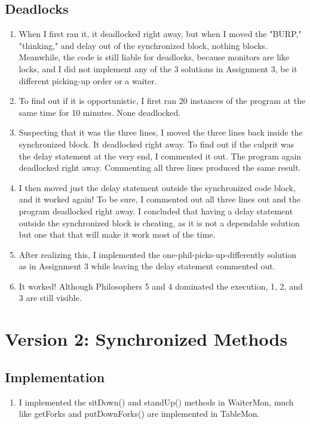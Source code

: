 \documentclass{article}
\begin{document}
\subsection{Deadlocks}
\begin{enumerate}
	\item [] When I first ran it, it deadlocked right away, but when I moved the "BURP," "thinking," and delay out of the synchronized block, nothing blocks. Meanwhile, the code is still liable for deadlocks, because monitors are like locks, and I did not implement any of the 3 solutions in Assignment 3, be it different picking-up order or a waiter.
	\item [] To find out if it is opportunistic, I first ran 20 instances of the program at the same time for 10 minutes. None deadlocked.
	\item [] Suspecting that it was the three lines, I moved the three lines back inside the synchronized block. It deadlocked right away. To find out if the culprit was the delay statement at the very end, I commented it out. The program again deadlocked right away. Commenting all three lines produced the same result.
	\item [] I then moved just the delay statement outside the synchronized code block, and it worked again! To be sure, I commented out all three lines out and the program deadlocked right away. I concluded that having a delay statement outside the synchronized block is cheating, as it is not a dependable solution but one that that will make it work most of the time.
	\item [] After realizing this, I implemented the one-phil-picks-up-differently solution as in Assignment 3 while leaving the delay statement commented out. 
	\item [] It worked! Although Philosophers 5 and 4 dominated the execution, 1, 2, and 3 are still visible.
\end{enumerate}

\section{Version 2: Synchronized Methods}

\subsection{Implementation}

\begin{enumerate}
	\item [] I implemented the sitDown() and standUp() methods in WaiterMon, much like getForks and putDownForks() are implemented in TableMon. 
\end{enumerate}
\end{document}
